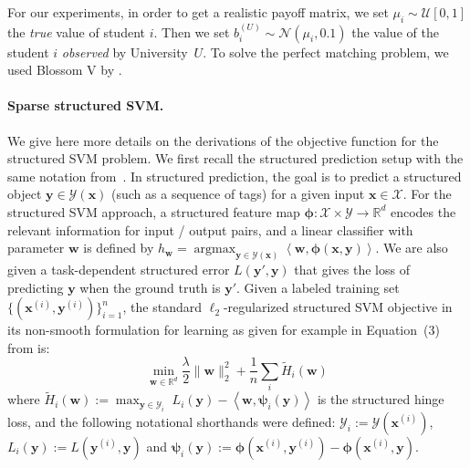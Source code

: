 \documentclass[twoside]{article}
\newcommand{\R}{\mathbb{R}}
\newcommand{\X}{\mathcal{X}}
\newcommand{\Y}{\mathcal{Y}}
\newcommand{\prodscal}[2]{\left\langle#1,#2\right\rangle}
\newcommand{\x}{\bm{x}}
\newcommand{\y}{\bm{y}}
\DeclareMathOperator*{\argmax}{\arg\max}
\newcommand{\0}{\mathbf{0}} %
\begin{document}
For our experiments, in order to get a realistic payoff matrix, we set $\mu_i \sim \mathcal U[0,1]$ the \emph{true} value of student $i$. Then we set $b_i^{(U)}\sim \mathcal N(\mu_i, 0.1)$ the value of the student $i$ \emph{observed} by University~$U$. To solve the perfect matching problem, we used Blossom V by . 
  \paragraph{Sparse structured SVM.} %
  \label{par:Structured SVM}
  We give here more details on the derivations of the objective function for the structured SVM problem.
  We first recall the structured prediction setup with the same notation from~\citep{lacoste2013block}. In structured prediction, the goal is to predict a structured object $\y \in \Y(\x)$ (such as a sequence of tags) for a given input $\x \in \X$. For the structured SVM approach, a structured feature map $\bm{\phi} : \X \times \Y \rightarrow \R^d$ encodes the relevant information for input / output pairs, and a linear classifier with parameter $\bm{w}$ is defined by $h_{\bm{w}} = \argmax_{\y \in \Y(\x)} \prodscal{\bm{w}}{\bm{\phi}(\x, \y)}$. We are also given a task-dependent structured error $L(\y', \y)$ that gives the loss of predicting $\y$ when the ground truth is $\y'$. Given a labeled training set $\{(\x^{(i)}, \y^{(i)})\}_{i=1}^n$, the standard $\ell_2$-regularized structured SVM objective in its non-smooth formulation for learning as given for example in Equation~(3) from \citep{lacoste2013block} is:
  \begin{equation}
    \min_{ \bm{w} \in \R^d} \frac{\lambda}{2}\|\bm{w}\|_2^2 + \frac{1}{n} \sum_i \tilde H_i(\bm{w})
  \end{equation}
  where $\tilde H_i(\bm{w}) := \max_{\y \in \mathcal Y_i} \; L_i(\y) - \prodscal{\bm{w}}{\bm{\psi}_i(\y)}$ is the structured hinge loss, and the following notational shorthands were defined: $\Y_i := \Y(\x^{(i)})$, $L_i(\y) := L(\y^{(i)}, \y)$ and $\bm{\psi}_i(\y) := \bm{\phi}(\x^{(i)},\y^{(i)}) - \bm{\phi}(\x^{(i)},\y)$.
  
\end{document}
